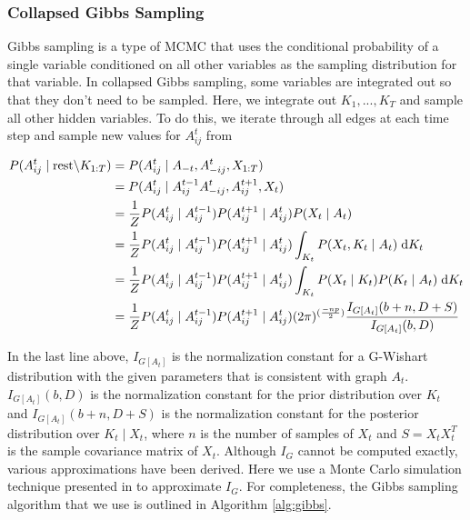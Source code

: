 \documentclass{article}
\begin{document}
\subsubsection{Collapsed Gibbs Sampling}

Gibbs sampling is a type of MCMC that uses the conditional probability of a single variable conditioned on all other variables as the sampling distribution for that variable. In collapsed Gibbs sampling, some variables are integrated out so that they don't need to be sampled. Here, we integrate out $K_1,...,K_T$ and sample all other hidden variables. To do this, we iterate through all edges at each time step and sample new values for $A_{ij}^t$ from 

\begin{align*}
P(A_{ij}^t \mid \text{rest} \backslash K_{1:T}) &= P(A_{ij}^t \mid A_{-t}, A_{-ij}^t, X_{1:T}) \\
&= P(A_{ij}^t \mid A_{ij}^{t-1} A_{-ij}^t, A_{ij}^{t+1}, X_t) \\
&= \frac{1}{Z} P(A_{ij}^t \mid A_{ij}^{t-1}) P(A_{ij}^{t+1} \mid A_{ij}^t) P(X_t \mid A_t) \\
&= \frac{1}{Z} P(A_{ij}^t \mid A_{ij}^{t-1}) P(A_{ij}^{t+1} \mid A_{ij}^t) \int_{K_t} P(X_t, K_t \mid A_t) \hspace{0.1cm} \mathrm{d} K_t \\
&= \frac{1}{Z} P(A_{ij}^t \mid A_{ij}^{t-1}) P(A_{ij}^{t+1} \mid A_{ij}^t) \int_{K_t} P(X_t \mid K_t) P(K_t \mid A_t) \hspace{0.1cm} \mathrm{d} K_t \\
&= \frac{1}{Z} P(A_{ij}^t \mid A_{ij}^{t-1}) P(A_{ij}^{t+1} \mid A_{ij}^t) (2\pi)^{(\frac{-np}{2})} \frac{I_{G[A_t]}(b+n, D+S)}{I_{G[A_t]}(b, D)}
\end{align*}

In the last line above, $I_{G[A_t]}$ is the normalization constant for a G-Wishart distribution with the given parameters that is consistent with graph $A_t$. $I_{G[A_t]}(b,D)$ is the normalization constant for the prior distribution over $K_t$ and $I_{G[A_t]}(b+n,D+S)$ is the normalization constant for the posterior distribution over $K_t \mid X_t$, where $n$ is the number of samples of $X_t$ and $S = X_t X_t^T$ is the sample covariance matrix of $X_t$. Although $I_G$ cannot be computed exactly, various approximations have been derived. Here we use a Monte Carlo simulation technique presented in \cite{ataykayismassam} to approximate $I_G$. For completeness, the Gibbs sampling algorithm that we use is outlined in Algorithm \ref{alg:gibbs}.
\end{document}
